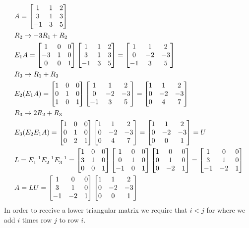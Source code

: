 \documentclass[11pt, fleqn]{article}
\begin{document}
\begin{align*}
    &A=\matrixx{1 & 1 & 2\\ 3 & 1 & 3\\ -1& 3 & 5}\\
    &R_2\to -3R_1+R_2\\
    &E_1A=\matrixx{1 &0 & 0\\ -3& 1 & 0\\ 0 & 0 & 1}\matrixx{1 & 1 & 2\\ 3 & 1 & 3\\ -1& 3 & 5}=\matrixx{1 & 1 & 2\\ 0 & -2 & -3\\ -1 & 3 & 5}\\
    &R_3\to R_1+R_3\\
    &E_2(E_1A)=\matrixx{1 & 0 & 0\\ 0 & 1 & 0\\ 1 & 0 & 1}\matrixx{1 & 1 & 2\\ 0 & -2 & -3\\ -1 & 3 & 5}=\matrixx{1 & 1 & 2\\ 0 & -2 & -3\\ 0 & 4 & 7}\\
    &R_3\to 2R_2+R_3\\
    &E_3(E_2E_1A)=\matrixx{1 &0 & 0\\ 0 & 1 & 0\\ 0 & 2 & 1}\matrixx{1 & 1 & 2\\ 0 & -2 & -3\\ 0 & 4 & 7}=\matrixx{1 & 1& 2\\ 0 & -2 & -3\\ 0 & 0 & 1}=U\\
    &L=E_1^{-1}E_2^{-1}E_3^{-1}=\matrixx{1 &0 & 0\\ 3& 1 & 0\\ 0 & 0 & 1}\matrixx{1 & 0 & 0\\ 0 & 1 & 0\\ -1 & 0 & 1}\matrixx{1 &0 & 0\\ 0 & 1 & 0\\ 0 & -2 & 1}=\matrixx{1 & 0 & 0\\ 3 & 1 & 0\\ -1 & -2 & 1}\\
    &A=LU=\matrixx{1 & 0 & 0\\ 3 & 1 & 0\\ -1 & -2 & 1}\matrixx{1 & 1& 2\\ 0 & -2 & -3\\ 0 & 0 & 1}
\end{align*}
In order to receive a lower triangular matrix we require that $i<j$ for where we add $i$ times row $j$ to row $i$.\\
\end{document}
